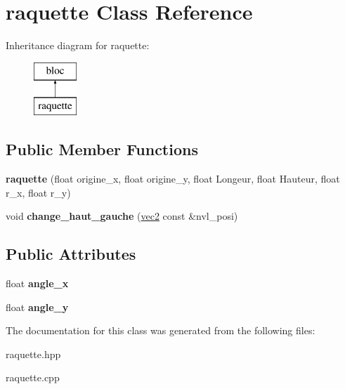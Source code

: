 \hypertarget{classraquette}{\section{raquette Class Reference}
\label{classraquette}
}
Inheritance diagram for raquette\-:\begin{figure}[H]
\begin{center}
\leavevmode
\includegraphics[height=2.000000cm]{classraquette}
\end{center}
\end{figure}
\subsection*{Public Member Functions}
\begin{DoxyCompactItemize}
\item 
\hypertarget{classraquette_ae8d1bbdc269988d69744c2279e6fdb21}{{\bfseries raquette} (float origine\-\_\-x, float origine\-\_\-y, float Longeur, float Hauteur, float r\-\_\-x, float r\-\_\-y)}\label{classraquette_ae8d1bbdc269988d69744c2279e6fdb21}

\item 
\hypertarget{classraquette_ad27917229e057c6131ef829eb5060e7a}{void {\bfseries change\-\_\-haut\-\_\-gauche} (\hyperlink{structvec2}{vec2} const \&nvl\-\_\-posi)}\label{classraquette_ad27917229e057c6131ef829eb5060e7a}

\end{DoxyCompactItemize}
\subsection*{Public Attributes}
\begin{DoxyCompactItemize}
\item 
\hypertarget{classraquette_aa9116c7e8a4f6f624a7489373c142b24}{float {\bfseries angle\-\_\-x}}\label{classraquette_aa9116c7e8a4f6f624a7489373c142b24}

\item 
\hypertarget{classraquette_a123b38337c44f8a99b9c32332c8ee484}{float {\bfseries angle\-\_\-y}}\label{classraquette_a123b38337c44f8a99b9c32332c8ee484}

\end{DoxyCompactItemize}


The documentation for this class was generated from the following files\-:\begin{DoxyCompactItemize}
\item 
raquette.\-hpp\item 
raquette.\-cpp\end{DoxyCompactItemize}
